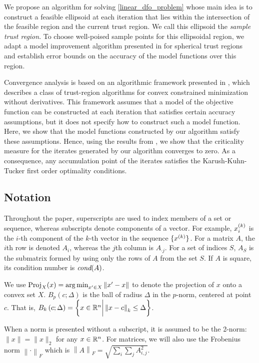 \documentclass{article}
\begin{document}
We propose an algorithm for solving \cref{linear_dfo_problem} whose main idea is to construct a feasible ellipsoid at each iteration that lies within the intersection of the feasible region and the current trust region.   We call this ellipsoid the {\em sample trust region}.
To choose well-poised sample points for this ellipsoidal region,  we adapt a model improvement algorithm presented in \cite{introduction_book} for spherical trust regions and establish error bounds on the accuracy of the model functions over this region.    

Convergence analysis is based on an algorithmic framework presented in \cite{Conejo:2013:GCT:2620806.2621814},  which describes a class of trust-region algorithms for convex constrained minimization without derivatives.   This framework assumes that a model of the objective function can be constructed at each iteration that satisfies certain accuracy assumptions, but it does not specify how to construct such a model function.    Here, we show that the model functions constructed by our algorithm satisfy these assumptions.  Hence,  using the results from \cite{Conejo:2013:GCT:2620806.2621814}, we show that
the criticality measure for the iterates generated by our algorithm converges to zero.  As a consequence, any accumulation point of the iterates satisfies the Karush-Kuhn-Tucker first order optimality conditions.  


\subsection{Notation}

Throughout the paper, superscripts are used to index members of a set or sequence, whereas subscripts denote components of a vector.  For example,  
$x_i^{(k)}$ is the $i$-th component of the $k$-th vector in the sequence $\{x^{(k)}\}$.
For a matrix $A$,  the $i$th row is denoted $A_i$, whereas the $j$th column is $A_{\cdot j}$.  
For a set of indices $S$,  $A_S$ is the submatrix formed by using only the rows of $A$ from the set $S$.   If $A$ is square, its condition number is $\textit{cond}(A)$. 

We use ${\textrm{Proj}}_X(x) = \operatorname*{arg\,min}_{x' \in X}\left\|x' - x\right\|$ to denote the projection of $x$ onto a convex set $X$.   $B_p\left(c; \Delta\right)$ is the ball of radius $\Delta$ in the $p$-norm, centered at point $c$.  That is,  $B_k\left(c; \Delta\right) = \left\{x \in \mathbb R^n \bigg | \left\|x - c\right\|_k \le \Delta \right\}$.

When a norm is presented without a subscript, it is assumed to be the 2-norm: $\|x\| = \|x\|_2$ for any $x \in \mathbb R^n$.  For matrices, we will also use the Frobenius norm $\left\|\cdot\right\|_F$ which is $\left\|A\right\|_F = \sqrt{\sum_i\sum_jA_{i, j}^2}$.
\end{document}
